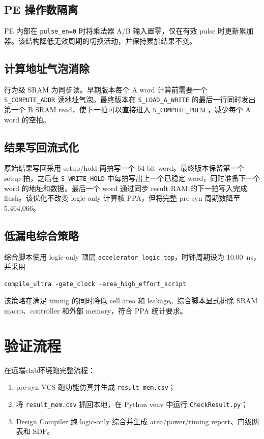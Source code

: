 \documentclass[UTF8,a4paper,zihao=-4]{ctexart}
\begin{document}
\subsection{PE 操作数隔离}

PE 内部在 \texttt{pulse\_en=0} 时将乘法器 A/B 输入置零，仅在有效 pulse 时更新累加器。该结构降低无效周期的切换活动，并保持累加结果不变。

\subsection{计算地址气泡消除}

行为级 SRAM 为同步读。早期版本每个 A word 计算前需要一个 \texttt{S\_COMPUTE\_ADDR} 读地址气泡。最终版本在 \texttt{S\_LOAD\_A\_WRITE} 的最后一行同时发出第一个 B SRAM read，使下一拍可以直接进入 \texttt{S\_COMPUTE\_PULSE}，减少每个 A word 的空拍。

\subsection{结果写回流式化}

原始结果写回采用 setup/hold 两拍写一个 64 bit word。最终版本保留第一个 setup 拍，之后在 \texttt{S\_WRITE\_HOLD} 中每拍写出上一个已稳定 word，同时准备下一个 word 的地址和数据。最后一个 word 通过同步 result RAM 的下一拍写入完成 flush。该优化不改变 logic-only 计算核 PPA，但将完整 pre-syn 周期数降至 5,464,066。

\subsection{低漏电综合策略}

综合脚本使用 logic-only 顶层 \texttt{accelerator\_logic\_top}，时钟周期设为 \SI{10.00}{ns}，并采用
\begin{verbatim}
compile_ultra -gate_clock -area_high_effort_script
\end{verbatim}
该策略在满足 timing 的同时降低 cell area 和 leakage。综合脚本显式排除 SRAM macro、controller 和外部 memory，符合 PPA 统计要求。

\section{验证流程}
在远端clab环境跑完整流程：
\begin{enumerate}
  \item pre-syn VCS 跑功能仿真并生成 \texttt{result\_mem.csv}；
  \item 将 \texttt{result\_mem.csv} 抓回本地，在 Python venv 中运行 \texttt{CheckResult.py}；
  \item Design Compiler 跑 logic-only 综合并生成 area/power/timing report、门级网表和 SDF。
\end{enumerate}
\end{document}
